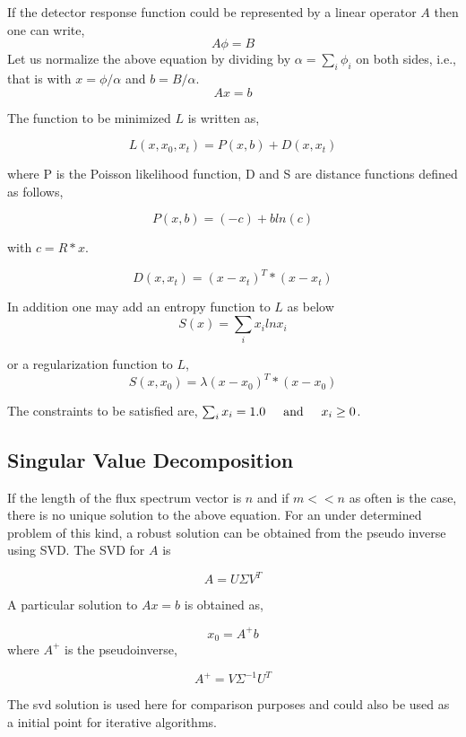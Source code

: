 \documentclass[review]{elsarticle}
\begin{document}
If the detector response function could be represented by a linear operator $A$ then one can write,
\begin{equation}
\label{AphiB}
A \phi=B
\end{equation}
Let us normalize the above equation by dividing by $\alpha =\sum_i\phi_i$ on both sides, i.e., that is with $x=\phi/\alpha $ and $b=B/\alpha$.
\begin{equation}
\label{AphiB}
A x=b
\end{equation}


The function to be minimized $L$ is written as, 

$$
L(x,x_0,x_t)= P(x,b)+D(x,x_t)
$$

where P is the Poisson likelihood function, D and S are distance functions defined as follows,

$$
\label{Poisson}
P(x,b)=(-c) +b ln (c)  
$$

with $ c= R*x$.

$$
D(x,x_t) = (x-x_t)^T*(x-x_t)
$$

In addition one may add an entropy function to $L$ as below 
$$
S(x)=\sum_i x_i ln x_i 
$$

or a regularization function to $L$,
$$
S(x,x_0) = \lambda (x-x_0)^T*(x-x_0)
$$

The constraints to be satisfied are, $
\sum_i x_i = 1.0  \hspace{5mm} \text{and} \hspace{5mm} x_i \ge 0 $.

\subsection{Singular Value Decomposition}

If the length of the flux spectrum vector is $n$ and if $m<< n$ as often is the case, there is no unique solution to the above equation.
For an under determined problem of this kind, a robust solution can be obtained from the pseudo inverse using SVD.
The SVD for $A$ is

\begin{equation}
A=U\Sigma V^T
\end{equation}

A particular solution to $Ax=b$ is obtained as,

\[  x_0 = A^+  b\]
where $A^+$ is the pseudoinverse,

\[  A^+  = V\Sigma^{-1} U^T\]
 
 The svd solution is used here for comparison purposes and could also be used as a initial point for iterative algorithms. 
 
\end{document}
